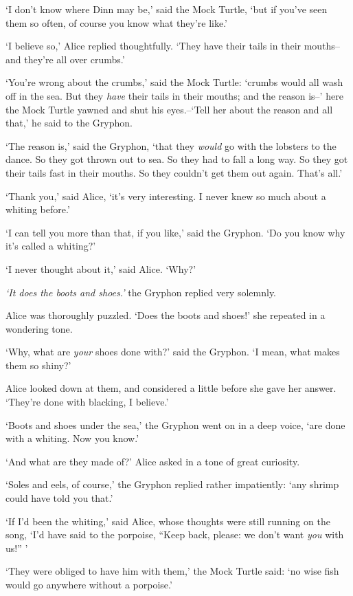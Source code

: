   `I don't know where Dinn may be,' said the Mock Turtle, `but
if you've seen them so often, of course you know what they're
like.'

  `I believe so,' Alice replied thoughtfully.  `They have their
tails in their mouths--and they're all over crumbs.'

  `You're wrong about the crumbs,' said the Mock Turtle:
`crumbs would all wash off in the sea.  But they {\it have} their tails
in their mouths; and the reason is--' here the Mock Turtle
yawned and shut his eyes.--`Tell her about the reason and all
that,' he said to the Gryphon.

  `The reason is,' said the Gryphon, `that they {\it would} go with
the lobsters to the dance.  So they got thrown out to sea.  So
they had to fall a long way.  So they got their tails fast in
their mouths.  So they couldn't get them out again.  That's all.'

  `Thank you,' said Alice, `it's very interesting.  I never knew
so much about a whiting before.'

  `I can tell you more than that, if you like,' said the
Gryphon.  `Do you know why it's called a whiting?'

  `I never thought about it,' said Alice.  `Why?'

  {\it `It does the boots and shoes.'} the Gryphon replied very
solemnly.

  Alice was thoroughly puzzled.  `Does the boots and shoes!' she
repeated in a wondering tone.

  `Why, what are {\it your} shoes done with?' said the Gryphon.  `I
mean, what makes them so shiny?'

  Alice looked down at them, and considered a little before she
gave her answer.  `They're done with blacking, I believe.'

  `Boots and shoes under the sea,' the Gryphon went on in a deep
voice, `are done with a whiting.  Now you know.'

  `And what are they made of?' Alice asked in a tone of great
curiosity.

  `Soles and eels, of course,' the Gryphon replied rather
impatiently:  `any shrimp could have told you that.'

  `If I'd been the whiting,' said Alice, whose thoughts were
still running on the song, `I'd have said to the porpoise, ``Keep
back, please:  we don't want {\it you} with us!'' '

  `They were obliged to have him with them,' the Mock Turtle
said:  `no wise fish would go anywhere without a porpoise.'

